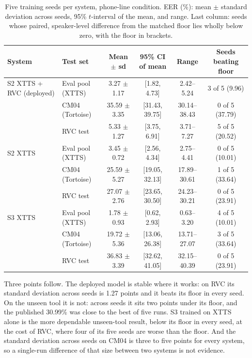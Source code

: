 \begin{table}[t]
\centering
\caption{Five training seeds per system, phone-line condition. EER (\%): mean
$\pm$ standard deviation across seeds, 95\% $t$-interval of the mean, and range. Last
column: seeds whose paired, speaker-level difference from the matched floor lies
wholly below zero, with the floor in brackets.}
\label{tab:seeds}
\small
\begin{tabular}{@{}llcccc@{}}
\toprule
System & Test set & Mean $\pm$ sd & 95\% CI of mean & Range & Seeds beating floor \\
\midrule
S2 XTTS + RVC (deployed) & Eval pool (XTTS) & 3.27 $\pm$ 1.17 & [1.82, 4.73] & 2.42--5.24 & 3 of 5 (9.96) \\
                         & CM04 (Tortoise) & 35.59 $\pm$ 3.35 & [31.43, 39.75] & 30.14--38.43 & 0 of 5 (37.79) \\
                         & RVC test & 5.33 $\pm$ 1.27 & [3.75, 6.91] & 3.71--7.27 & 5 of 5 (20.52) \\
\midrule
S2 XTTS & Eval pool (XTTS) & 3.45 $\pm$ 0.72 & [2.56, 4.34] & 2.75--4.41 & 0 of 5 (10.01) \\
        & CM04 (Tortoise) & 25.59 $\pm$ 5.27 & [19.05, 32.13] & 17.89--30.61 & 1 of 5 (33.64) \\
        & RVC test & 27.07 $\pm$ 2.76 & [23.65, 30.50] & 24.23--30.21 & 0 of 5 (23.91) \\
\midrule
S3 XTTS & Eval pool (XTTS) & 1.78 $\pm$ 0.93 & [0.62, 2.93] & 0.63--3.20 & 4 of 5 (10.01) \\
        & CM04 (Tortoise) & 19.72 $\pm$ 5.36 & [13.06, 26.38] & 13.71--27.07 & 3 of 5 (33.64) \\
        & RVC test & 36.83 $\pm$ 3.39 & [32.62, 41.05] & 32.15--40.39 & 0 of 5 (23.91) \\
\bottomrule
\end{tabular}
\end{table}

Three points follow. The deployed model is stable where it works: on RVC its standard
deviation across seeds is 1.27 points and it beats its floor in every seed. On the
unseen tool it is not: across seeds it sits two points under its floor, and the
published 30.99\% was close to the best of five runs. S3 trained on XTTS alone is the
more dependable unseen-tool result, below its floor in every seed, at the cost of
RVC, where four of its five seeds are worse than the floor. And the standard
deviation across seeds on CM04 is three to five points for every system, so a
single-run difference of that size between two systems is not evidence.

